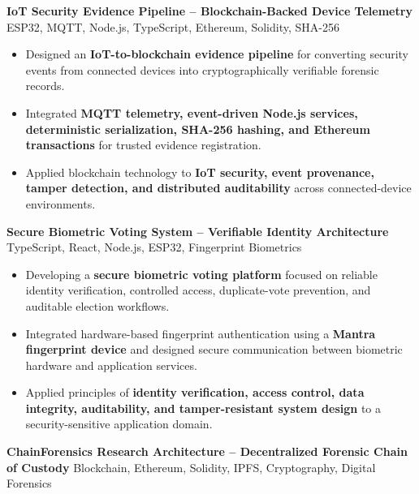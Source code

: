 \documentclass[a4paper,11pt]{article}
\newcommand{\resumeItem}[1]{
    \item \small{#1 \vspace{-2pt}}
}
\newcommand{\resumeProject}[2]{
    \vspace{2pt}
    \textbf{#1} \hfill {\small #2}
    \vspace{2pt}
}
\begin{document}
\resumeProject
{IoT Security Evidence Pipeline -- Blockchain-Backed Device Telemetry}
{ESP32, MQTT, Node.js, TypeScript, Ethereum, Solidity, SHA-256}

\begin{itemize}[leftmargin=*]

\resumeItem{Designed an \textbf{IoT-to-blockchain evidence pipeline} for converting security events from connected devices into cryptographically verifiable forensic records.}

\resumeItem{Integrated \textbf{MQTT telemetry, event-driven Node.js services, deterministic serialization, SHA-256 hashing, and Ethereum transactions} for trusted evidence registration.}

\resumeItem{Applied blockchain technology to \textbf{IoT security, event provenance, tamper detection, and distributed auditability} across connected-device environments.}

\end{itemize}

\vspace{1mm}

\resumeProject
{Secure Biometric Voting System -- Verifiable Identity Architecture}
{TypeScript, React, Node.js, ESP32, Fingerprint Biometrics}

\begin{itemize}[leftmargin=*]

\resumeItem{Developing a \textbf{secure biometric voting platform} focused on reliable identity verification, controlled access, duplicate-vote prevention, and auditable election workflows.}

\resumeItem{Integrated hardware-based fingerprint authentication using a \textbf{Mantra fingerprint device} and designed secure communication between biometric hardware and application services.}

\resumeItem{Applied principles of \textbf{identity verification, access control, data integrity, auditability, and tamper-resistant system design} to a security-sensitive application domain.}

\end{itemize}

\vspace{1mm}

\resumeProject
{ChainForensics Research Architecture -- Decentralized Forensic Chain of Custody}
{Blockchain, Ethereum, Solidity, IPFS, Cryptography, Digital Forensics}
\end{document}
